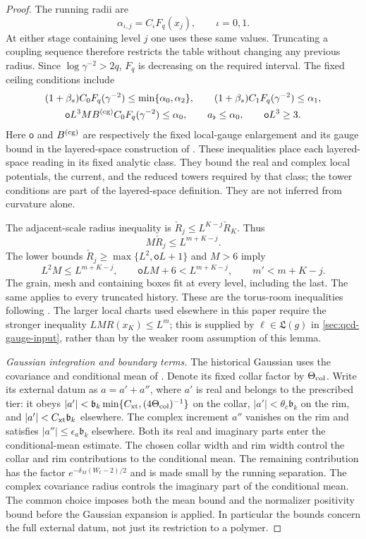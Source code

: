 \documentclass[11pt,letterpaper,reqno]{amsart}
\theoremstyle{definition}
\theoremstyle{remark}
\begin{document}
\begin{proof}
The running radii are
\[
 \alpha_{\iota,j}=C_\iota F_q(x_j),\qquad \iota=0,1.
\]
At either stage containing level $j$ one uses these same values.
Truncating a coupling sequence therefore restricts the table
without changing any previous radius. Since $\log\gamma^{-2}>2q$,
$F_q$ is decreasing on the required interval. The fixed ceiling
conditions include
\[
 \begin{gathered}
 (1+\beta_s)C_0F_q(\gamma^{-2})\le\min\{\alpha_0,\alpha_2\},
 \qquad
 (1+\beta_s)C_1F_q(\gamma^{-2})\le\alpha_1,\\
 \mathsf o L^3M B^{(\rm cg)}C_0F_q(\gamma^{-2})\le\alpha_0,
 \qquad a_\flat\le\alpha_0,\qquad \mathsf o L^3\ge3.
 \end{gathered}
\]
Here $\mathsf o$ and $B^{(\rm cg)}$ are respectively the fixed
local-gauge enlargement and its gauge bound in the layered-space
construction of \cite{YMM1}. These inequalities place each
layered-space reading in its fixed analytic class. They bound the
real and complex local potentials, the current, and the reduced
towers required by that class; the tower conditions are part of
the layered-space definition. They are not inferred from curvature
alone. 

The adjacent-scale radius inequality is
$\check R_j\le L^{K-j}\check R_K$. Thus
\[
 M\check R_j\le L^{m+K-j}.
\]
The lower bounds $\check R_j\ge\max\{L^2,\mathsf oL+1\}$ and
$M>6$ imply
\[
 L^2M\le L^{m+K-j},\qquad
 \mathsf oLM+6<L^{m+K-j},\qquad m'<m+K-j.
\]
The grain, mesh and containing boxes fit at every level, including
the last. The same applies to every truncated history. These are
the torus-room inequalities following \cite[Prop.~4.163]{YMM1}.
The larger local charts used elsewhere in this paper require the
stronger inequality $LMR(x_K)\le L^m$; this is supplied by
$\ell\in\mathfrak L(g)$ in \cref{sec:qcd-gauge-input}, rather
than by the weaker room assumption of this lemma.

\emph{Gaussian integration and boundary terms.}
The historical Gaussian uses the covariance and conditional mean
of \cite[Prop.~4.99]{YMM1}. Denote its fixed collar factor by
$\Theta_{\rm col}$. Write its external datum as $a=a'+a''$, where $a'$
is real and belongs to the prescribed tier: it obeys
$|a'|<\mathfrak b_k\min\{C_{\rm xt},(4\Theta_{\rm col})^{-1}\}$
on the collar, $|a'|<\theta_c\mathfrak b_k$ on the rim,
and $|a'|<C_{\rm xt}\mathfrak b_k$ elsewhere.
The complex increment $a''$ vanishes on the rim
and satisfies $|a''|\le\epsilon_a\mathfrak b_k$
elsewhere. Both its real and imaginary parts enter
the conditional-mean estimate.
The chosen collar width and rim width control
the collar and rim contributions to the conditional mean. The
remaining contribution has the factor
$e^{-\delta_M(W_t-2)/2}$ and is made small by the running
separation. The complex covariance radius controls the imaginary
part of the conditional mean. The common choice imposes both
the mean bound and the normalizer positivity bound before the
Gaussian expansion is applied. In particular the bounds concern
the full external datum, not just its restriction to a polymer.


\end{proof}
\end{document}
